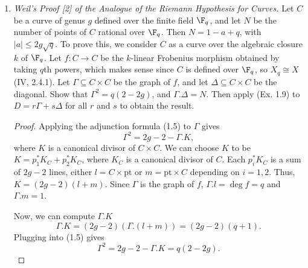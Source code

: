 \documentclass[a4paper]{article}
\begin{document}
\begin{enumerate} [label=\textbf{\arabic*.}, leftmargin=0em]
          \begin{example}
              Consider the quadric surface $Q = \P^1 \times \P^1$ and the divisor $H$ of type $(1, 1)$.
              If $D$ be a divisor of type $(a, b)$, then by (1.4.3), the left-hand side is equal to $2ab$, while the right-hand side is equal to $(a + b)^2$ (IV, 6.4.1) (Ex. 1.1).
          \end{example}

    \item \textit{Weil's Proof [2] of the Analogue of the Riemann Hypothesis for Curves.} Let $C$ be a curve of genus $g$ defined over the finite field $\F_q$, and let $N$ be the number of points of $C$ rational over $\F_q$.
          Then $N = 1 - a + q$, with $|a| \leq 2g \sqrt{q}$.
          To prove this, we consider $C$ as a curve over the algebraic closure $k$ of $\F_q$.
          Let $f : C \to C$ be the $k$-linear Frobenius morphism obtained by taking $q$th powers, which makes sense since $C$ is defined over $\F_q$, so $X_q \cong X$ (IV, 2.4.1).
          Let $\Gamma \subseteq C \times C$ be the graph of $f$, and let $\Delta \subseteq C \times C$ be the diagonal.
          Show that $\Gamma^2 = q(2 - 2g)$, and $\Gamma.\Delta = N$.
          Then apply (Ex. 1.9) to $D = r\Gamma + s\Delta$ for all $r$ and $s$ to obtain the result.

          \begin{proof}
              Applying the adjunction formula (1.5) to $\Gamma$ gives
              \begin{equation*}
                  \Gamma^2 = 2g - 2 - \Gamma.K,
              \end{equation*}
              where $K$ is a canonical divisor of $C \times C$.
              We can choose $K$ to be $K = p_1^*K_C + p_2^*K_C$, where $K_C$ is a canonical divisor of $C$.
              Each $p_i^*K_C$ is a sum of $2g - 2$ lines, either $l = C \times \text{pt}$ or $m = \text{pt} \times C$ depending on $i = 1, 2$.
              Thus, $K = (2g - 2)(l + m)$.
              Since $\Gamma$ is the graph of $f$, $\Gamma.l = \deg{f} = q$ and $\Gamma.m = 1$.

              Now, we can compute $\Gamma.K$
              \begin{equation*}
                  \Gamma.K = (2g - 2)(\Gamma.(l + m)) = (2g - 2)(q + 1).
              \end{equation*}
              Plugging into (1.5) gives
              \begin{equation*}
                  \Gamma^2 = 2g - 2 - \Gamma.K = q(2 - 2g).
              \end{equation*}


\end{proof}
\end{enumerate}
\end{document}
